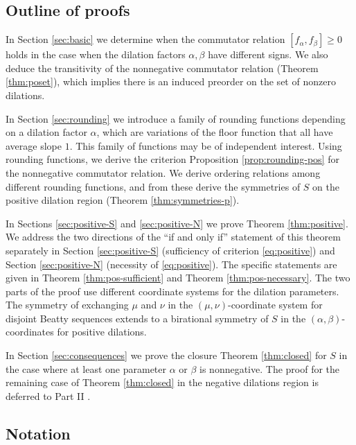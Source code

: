 \documentclass[11pt, letterpaper, reqno]{amsart}
\theoremstyle{definition}
\numberwithin{equation}{section}
\newcommand{\um}{{\mu}}
\newcommand{\vm}{{\nu}}
\begin{document}
%
%
\subsection{Outline of proofs}
\label{subsec:outline}

In Section \ref{sec:basic} we  determine when the commutator relation  
$[f_\alpha, f_\beta]\geq 0$  holds  
in the  case when the dilation factors $\alpha, \beta$ have different signs.
We also deduce the transitivity of the nonnegative commutator relation (Theorem \ref{thm:poset}),
which implies there is an induced preorder on the set of nonzero dilations.

In Section \ref{sec:rounding} we introduce a family of rounding functions 
depending on a dilation factor $\alpha$,
which are variations of the floor function that all have average slope $1$.
This family of functions may be of independent interest. 
Using rounding functions, we  derive the criterion 
Proposition  \ref{prop:rounding-pos}
for  the nonnegative commutator relation.
We derive ordering relations among different rounding functions,
and from these derive the symmetries of $S$ on the positive dilation region
 (Theorem \ref{thm:symmetries-p}).

In Sections \ref{sec:positive-S} and \ref{sec:positive-N} we prove Theorem \ref{thm:positive}.
We address the two directions of the ``if and only if'' statement of this theorem separately in 
Section \ref{sec:positive-S} (sufficiency of criterion \eqref{eq:positive})
and Section \ref{sec:positive-N} (necessity of \eqref{eq:positive}).
The specific statements are given in Theorem \ref{thm:pos-sufficient} and Theorem \ref{thm:pos-necessary}.
The two parts of the proof  use different coordinate systems for the dilation parameters.  
The symmetry of exchanging $\um$ and $\vm$ 
in the  $(\um,\vm)$-coordinate system for disjoint Beatty sequences
extends to a birational symmetry of $S$ in the $(\alpha, \beta)$-coordinates for positive dilations.

In Section \ref{sec:consequences}  we prove the closure  Theorem \ref{thm:closed}
for $S$ in the case where at least one parameter $\alpha$ or $\beta$ is nonnegative. 
The proof for the remaining  case of  Theorem \ref{thm:closed} 
in the negative dilations region is deferred to Part II \cite{LagR:2018b}.


%
%
\subsection{Notation}
\end{document}
